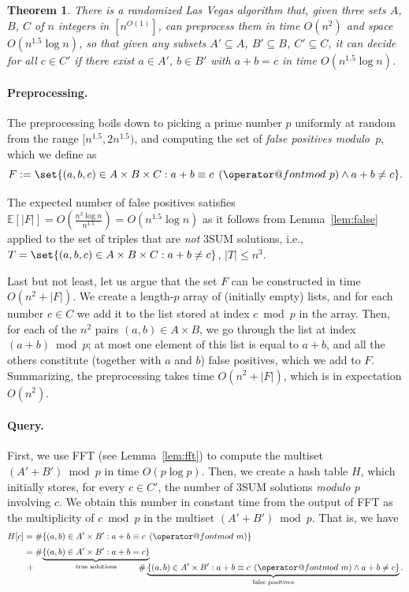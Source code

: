 \documentclass[10pt,a4paper]{article}
\makeatletter
\newtheorem{theorem}{Theorem}[section]
\newcommand{\E}{\mathbb{E}}
\newcommand{\tpmod}[1]{\mkern 8mu({\operator@font mod}\mkern 6mu#1)}
\makeatother
\begin{document}
\begin{theorem}\label{thm:knownc}
    There is a randomized Las Vegas algorithm that,
    given three sets $A$, $B$, $C$ of $n$ integers in $[n^{O(1)}]$, can preprocess them in time $O(n^2)$ and space $O(n^{1.5} \log n)$, so that given any subsets $A' \subseteq A$, $B' \subseteq B$, $C' \subseteq C$, it can decide for all $c \in C'$ if there exist $a \in A'$, $b \in B'$ with $a+b=c$ in time $O(n^{1.5} \log n)$.
\end{theorem}

\paragraph{Preprocessing.}

The preprocessing boils down to picking a prime number $p$ uniformly at random from the range $[n^{1.5}, 2n^{1.5})$, and computing the set of \emph{false positives modulo~$p$}, which we define as
\[F:= \set{ (a,b,c) \in A \times B \times C : a + b \equiv c \tpmod{p} \land a + b \neq c }.\]

The expected number of false positives satisfies $\E[|F|] = O(\frac{n^3 \log n}{n^{1.5}}) = O(n^{1.5} \log n)$ as it follows from Lemma~\ref{lem:false} applied to the set of triples that are \emph{not} 3SUM solutions, i.e., $T=\set{(a,b,c) \in A \times B \times C : a + b \neq c}$, $|T| \leqslant n^3$.

Last but not least, let us argue that the set $F$ can be constructed in time $O(n^2+|F|)$. We create a length-$p$ array of (initially empty) lists, and for each number $c \in C$ we add it to the list stored at index $c \bmod p$ in the array. Then, for each of the $n^2$ pairs $(a,b) \in A \times B$, we go through the list at index $(a + b) \bmod p$; at most one element of this list is equal to $a+b$, and all the others constitute (together with $a$ and $b$) false positives, which we add to $F$.
Summarizing, the preprocessing takes time ${O}(n^2 + |F|)$, which is in expectation $O(n^2)$.

\paragraph{Query.}
First, we use FFT (see Lemma~\ref{lem:fft}) to compute the multiset $(A'+B') \bmod p$ in time $O(p \log p)$.
Then, we create a hash table $H$, which initially stores, for every $c \in C'$, the number of 3SUM solutions \emph{modulo $p$} involving $c$. We obtain this number in constant time from the output of FFT as the multiplicity of $c \bmod p$ in the multiset $(A'+B') \bmod p$. That is, we have
\begin{align*}
H[c] &= \#\{(a,b) \in A' \times B' : a + b \equiv c \tpmod{m}\} \\[.3em]
& = \#\smash{\underbrace{\{(a,b) \in A' \times B' : a+b=c\}}_{\text{true solutions}}} \\[.3em]
& \, + \hspace{12em}  \#\underbrace{\{(a,b) \in A' \times B' : a + b \equiv c \tpmod{m} \land a + b \neq c\}}_{\text{false positives}}.
\end{align*}
\end{document}
